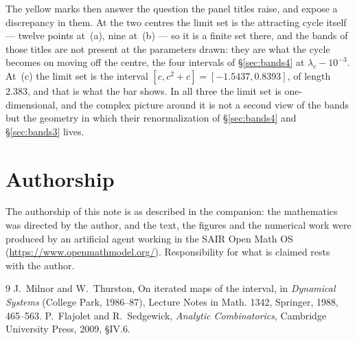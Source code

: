 \documentclass[11pt]{article}
\theoremstyle{plain}
\theoremstyle{definition}
\begin{document}
The yellow marks then answer the question the panel titles raise, and expose a discrepancy in
them.  At the two centres the limit set is the attracting cycle itself --- twelve
points at~(a), nine at~(b) --- so it is a finite set there, and the bands of those titles are
not present at the parameters drawn: they are what the cycle becomes on moving off the
centre, the four intervals of \S\ref{sec:bands4} at $\lambda_c-10^{-3}$.  At~(c) the limit set
is the interval $[c,c^2+c]=[-1.5437,0.8393]$, of length $2.383$, and that is what the bar
shows.  In all three the limit set is one-dimensional, and the complex picture around it is
not a second view of the bands but the geometry in which their renormalization of
\S\ref{sec:bands4} and \S\ref{sec:bands3} lives.

\section*{Authorship}

The authorship of this note is as described in the companion: the mathematics was directed by
the author, and the text, the figures and the numerical work were produced by an artificial
agent working in the SAIR Open Math OS (\url{https://www.openmathmodel.org/}).  Responsibility
for what is claimed rests with the author.

\begin{thebibliography}{9}\footnotesize\setlength{\itemsep}{1pt}\setlength{\parskip}{0pt}
 J.~Milnor and W.~Thurston, On iterated maps of the interval, in
\emph{Dynamical Systems} (College Park, 1986--87), Lecture Notes in Math. 1342,
Springer, 1988, 465--563.
 P.~Flajolet and R.~Sedgewick, \emph{Analytic Combinatorics},
Cambridge University Press, 2009, \S IV.6.
\end{thebibliography}
\end{document}

